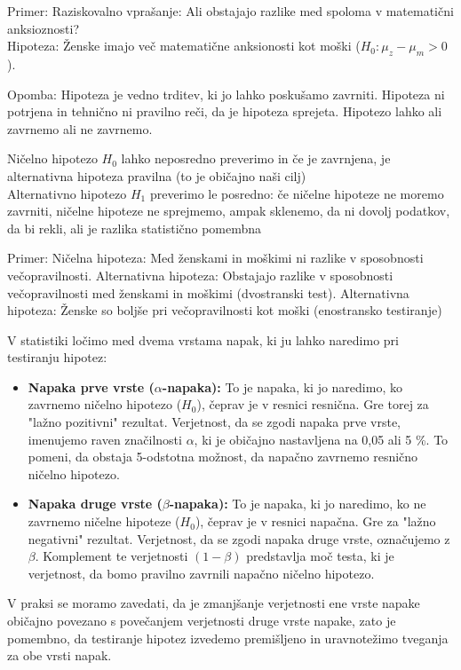 Primer: Raziskovalno vprašanje: Ali obstajajo razlike med spoloma v matematični anksioznosti?\\
Hipoteza: Ženske imajo več matematične anksionosti kot moški ($H_0: \mu_z - \mu_m >0$).

Opomba: Hipoteza je vedno trditev, ki jo lahko poskušamo zavrniti. Hipoteza ni potrjena in tehnično ni pravilno reči, da je hipoteza sprejeta. Hipotezo lahko ali zavrnemo ali ne zavrnemo.

Ničelno hipotezo $H_0$ lahko neposredno preverimo in če je zavrnjena, je alternativna hipoteza pravilna (to je običajno naši cilj)\\
Alternativno hipotezo $H_1$ preverimo le posredno: če ničelne hipoteze ne moremo zavrniti, ničelne hipoteze ne sprejmemo, ampak sklenemo, da ni dovolj podatkov, da bi rekli, ali je razlika statistično pomembna

Primer: Ničelna hipoteza: Med ženskami in moškimi ni razlike v sposobnosti večopravilnosti. Alternativna hipoteza: Obstajajo razlike v sposobnosti večopravilnosti med ženskami in moškimi (dvostranski test). Alternativna hipoteza: Ženske so boljše pri večopravilnosti kot moški (enostransko testiranje)

V statistiki ločimo med dvema vrstama napak, ki ju lahko naredimo pri testiranju hipotez:
\begin{itemize}
    \item \textbf{Napaka prve vrste ($\alpha$-napaka):} To je napaka, ki jo naredimo, ko zavrnemo ničelno hipotezo ($H_0$), čeprav je v resnici resnična. Gre torej za "lažno pozitivni" rezultat. Verjetnost, da se zgodi napaka prve vrste, imenujemo raven značilnosti $\alpha$, ki je običajno nastavljena na 0,05 ali 5 \%. To pomeni, da obstaja 5-odstotna možnost, da napačno zavrnemo resnično ničelno hipotezo.
    \item \textbf{Napaka druge vrste ($\beta$-napaka):} To je napaka, ki jo naredimo, ko ne zavrnemo ničelne hipoteze ($H_0$), čeprav je v resnici napačna. Gre za "lažno negativni" rezultat. Verjetnost, da se zgodi napaka druge vrste, označujemo z $\beta$. Komplement te verjetnosti $(1-\beta)$ predstavlja moč testa, ki je verjetnost, da bomo pravilno zavrnili napačno ničelno hipotezo.
\end{itemize}

V praksi se moramo zavedati, da je zmanjšanje verjetnosti ene vrste napake običajno povezano s povečanjem verjetnosti druge vrste napake, zato je pomembno, da testiranje hipotez izvedemo premišljeno in uravnotežimo tveganja za obe vrsti napak.


